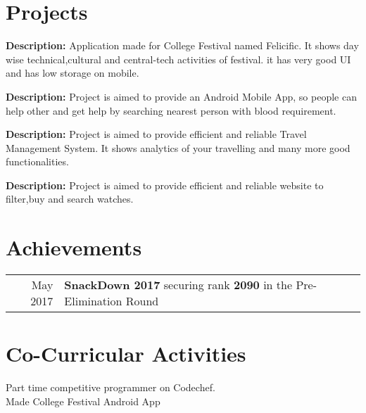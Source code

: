 \documentclass[]{denish-resume-openfont}
\begin{document}
\hfill
\begin{minipage}[t]{0.69\textwidth}


\section{Projects}



\textbf{Description:}  Application made for College Festival named Felicific. It shows day wise technical,cultural and central-tech activities of festival. it has very good UI and has low storage on mobile.\\
\sectionsep


\textbf{Description:} Project is aimed to provide an Android Mobile App, so people can help other and get help by searching nearest person with blood requirement.\\
\sectionsep

\textbf{Description:} Project is aimed to provide efficient and reliable Travel Management System. It shows analytics of your travelling and many more good functionalities.\\
\sectionsep

\textbf{Description:} Project is aimed to provide efficient and reliable website to filter,buy and search watches.\\
\sectionsep




\section{Achievements}
\begin{tabular}{rll}
May 2017        & \textbf{SnackDown 2017} securing rank \textbf{2090} in the Pre-Elimination Round \\
\end{tabular}
\sectionsep


\section{Co-Curricular Activities}
\textbullet{} Part time competitive programmer on Codechef. \\
\textbullet{} Made College Festival Android App \\
\sectionsep

\end{minipage}
\end{document}
